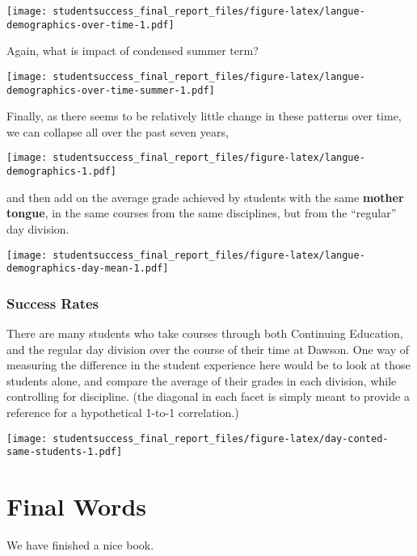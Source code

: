 \documentclass[]{book}
\theoremstyle{definition}
\theoremstyle{definition}
\theoremstyle{remark}
\begin{document}
\texttt{[image: studentsuccess\_final\_report\_files/figure-latex/langue-demographics-over-time-1.pdf]}

Again, what is impact of condensed summer term?

\texttt{[image: studentsuccess\_final\_report\_files/figure-latex/langue-demographics-over-time-summer-1.pdf]}

Finally, as there seems to be relatively little change in these patterns
over time, we can collapse all over the past seven years,

\texttt{[image: studentsuccess\_final\_report\_files/figure-latex/langue-demographics-1.pdf]}

and then add on the average grade achieved by students with the same
\textbf{mother tongue}, in the same courses from the same disciplines,
but from the ``regular'' day division.

\texttt{[image: studentsuccess\_final\_report\_files/figure-latex/langue-demographics-day-mean-1.pdf]}

\subsection{Success Rates}\label{success-rates}

There are many students who take courses through both Continuing
Education, and the regular day division over the course of their time at
Dawson. One way of measuring the difference in the student experience
here would be to look at those students alone, and compare the average
of their grades in each division, while controlling for discipline. (the
diagonal in each facet is simply meant to provide a reference for a
hypothetical 1-to-1 correlation.)

\texttt{[image: studentsuccess\_final\_report\_files/figure-latex/day-conted-same-students-1.pdf]}

\chapter{Final Words}\label{final-words}

We have finished a nice book.


\end{document}
